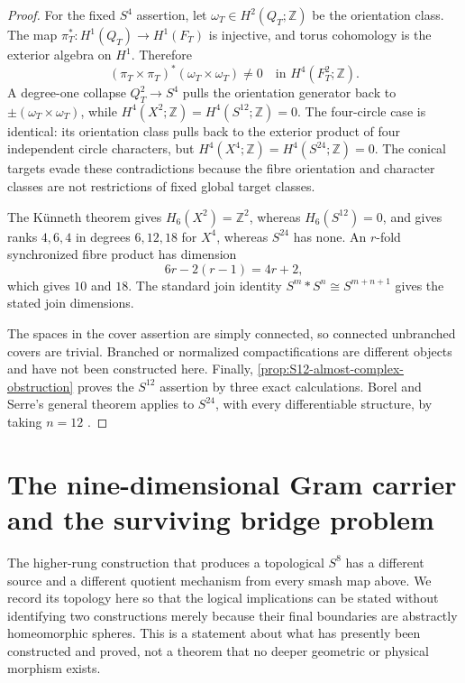 \documentclass[11pt,letterpaper]{article}
\numberwithin{equation}{section}
\theoremstyle{definition}
\theoremstyle{remark}
\newcommand{\Z}{\mathbb Z}
\begin{document}
\begin{proof}
For the fixed $S^4$ assertion, let $\omega_T\in H^2(Q_T;\Z)$ be the
orientation class.  The map $\pi_T^*:H^1(Q_T)\to H^1(F_T)$ is injective,
and torus cohomology is the exterior algebra on $H^1$.  Therefore
\begin{equation}
 (\pi_T\times\pi_T)^*(\omega_T\times\omega_T)\ne0
 \quad\text{in }H^4(F_T^2;\Z).
 \label{eq:fibre-H4}
\end{equation}
A degree-one collapse $Q_T^2\to S^4$ pulls the orientation generator back
to $\pm(\omega_T\times\omega_T)$, while
$H^4(X^2;\Z)=H^4(S^{12};\Z)=0$.  The four-circle case is identical: its
orientation class pulls back to the exterior product of four independent
circle characters, but $H^4(X^4;\Z)=H^4(S^{24};\Z)=0$.  The conical
targets evade these contradictions because the fibre orientation and
character classes are not restrictions of fixed global target classes.

The K\"unneth theorem gives $H_6(X^2)=\Z^2$, whereas $H_6(S^{12})=0$,
and gives ranks $4,6,4$ in degrees $6,12,18$ for $X^4$, whereas
$S^{24}$ has none.  An $r$-fold synchronized fibre product has dimension
\[
 6r-2(r-1)=4r+2,
\]
which gives $10$ and $18$.  The standard join identity
$S^m*S^n\cong S^{m+n+1}$ gives the stated join dimensions.

The spaces in the cover assertion are simply connected, so connected
unbranched covers are trivial.  Branched or normalized compactifications
are different objects and have not been constructed here.  Finally,
\cref{prop:S12-almost-complex-obstruction} proves the \(S^{12}\) assertion
by three exact calculations.  Borel and Serre's general theorem applies to
\(S^{24}\), with every differentiable structure, by taking \(n=12\)
\citep[\S15, Proposition~15.1 and the following remark,
p.~434]{BorelSerre1953}.
\end{proof}

\section{The nine-dimensional Gram carrier and the surviving bridge problem}
\label{sec:nine-dimensional-Gram-carrier}

The higher-rung construction that produces a topological \(S^8\) has a
different source and a different quotient mechanism from every smash map
above.  We record its topology here so that the logical implications can be
stated without identifying two constructions merely because their final
boundaries are abstractly homeomorphic spheres.  This is a statement about
what has presently been constructed and proved, not a theorem that no deeper
geometric or physical morphism exists.
\end{document}
